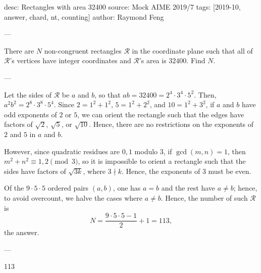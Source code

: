 desc: Rectangles with area 32400
source: Mock AIME 2019/7
tags: [2019-10, answer, chard, nt, counting]
author: Raymond Feng

---

There are $N$ non-congruent rectangles $\mathcal R$ in the coordinate plane such that all of $\mathcal R$'s vertices have integer coordinates and $\mathcal R$'s area is $32400$. Find $N$.

---

Let the sides of $\mathcal R$ be $a$ and $b$, so that $ab=32400=2^4\cdot 3^4\cdot 5^2$. Then, $a^2b^2=2^8\cdot 3^8\cdot 5^4$. Since $2=1^2+1^2$, $5=1^2+2^2$, and $10=1^2+3^2$, if $a$ and $b$ have odd exponents of $2$ or $5$, we can orient the rectangle such that the edges have factors of $\sqrt2$, $\sqrt5$, or $\sqrt{10}$. Hence, there are no restrictions on the exponents of $2$ and $5$ in $a$ and $b$.

However, since quadratic residues are $0,1$ modulo $3$, if $\gcd(m,n)=1$, then $m^2+n^2\equiv 1,2\pmod{3}$, so it is impossible to orient a rectangle such that the sides have factors of $\sqrt{3k}$, where $3\nmid k$. Hence, the exponents of $3$ must be even.

Of the $9\cdot 5\cdot 5$ ordered pairs $(a,b)$, one has $a=b$ and the rest have $a\ne b$; hence, to avoid overcount, we halve the cases where $a\ne b$. Hence, the number of such $\mathcal R$ is \[N=\frac{9\cdot 5\cdot 5-1}2+1=113,\]
the answer.

---

113
